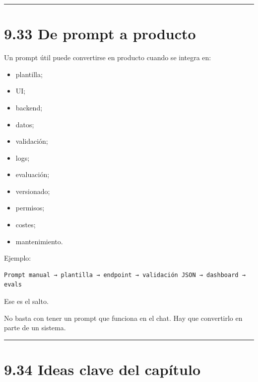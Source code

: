 \begin{center}\rule{0.5\linewidth}{0.5pt}\end{center}

\section{9.33 De prompt a producto}\label{de-prompt-a-producto}

Un prompt útil puede convertirse en producto cuando se integra en:

\begin{itemize}
\tightlist
\item
  plantilla;
\item
  UI;
\item
  backend;
\item
  datos;
\item
  validación;
\item
  logs;
\item
  evaluación;
\item
  versionado;
\item
  permisos;
\item
  costes;
\item
  mantenimiento.
\end{itemize}

Ejemplo:

\begin{lstlisting}
Prompt manual → plantilla → endpoint → validación JSON → dashboard → evals
\end{lstlisting}

Ese es el salto.

No basta con tener un prompt que funciona en el chat. Hay que
convertirlo en parte de un sistema.

\begin{center}\rule{0.5\linewidth}{0.5pt}\end{center}

\section{9.34 Ideas clave del
capítulo}\label{ideas-clave-del-capuxedtulo-8}

